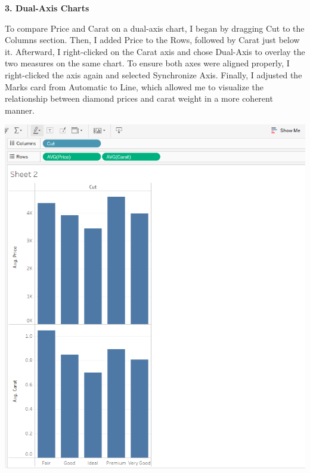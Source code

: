 \documentclass[
  letterpaper,
  DIV=11,
  numbers=noendperiod]{scrreprt}
\begin{document}
\textbf{3. Dual-Axis Charts}

To compare Price and Carat on a dual-axis chart, I began by dragging Cut
to the Columns section. Then, I added Price to the Rows, followed by
Carat just below it. Afterward, I right-clicked on the Carat axis and
chose Dual-Axis to overlay the two measures on the same chart. To ensure
both axes were aligned properly, I right-clicked the axis again and
selected Synchronize Axis. Finally, I adjusted the Marks card from
Automatic to Line, which allowed me to visualize the relationship
between diamond prices and carat weight in a more coherent manner.

\includegraphics{Step1_Dual_Axis_Chart_Price_Per_Carat _Olufawo.png}
\end{document}
